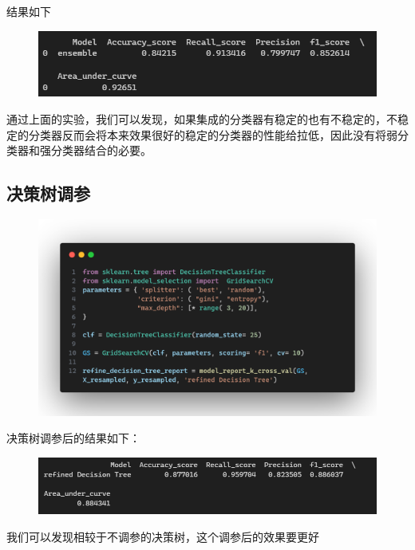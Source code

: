 \documentclass{article}
\begin{document}
结果如下
\begin{figure}[H]
	\centering
	\includegraphics[width=\textwidth]{./img/voting_res.png}
\end{figure}

通过上面的实验，我们可以发现，如果集成的分类器有稳定的也有不稳定的，不稳定的分类器反而会将本来效果很好的稳定的分类器的性能给拉低，因此没有将弱分类器和强分类器结合的必要。

\subsection{决策树调参}

\begin{figure}[H]
	\centering
	\includegraphics[width=\textwidth]{./img/refine_dt.png}
\end{figure}

决策树调参后的结果如下：

\begin{figure}[H]
	\centering
	\includegraphics[width=\textwidth]{./img/refine_res.png}
\end{figure}

我们可以发现相较于不调参的决策树，这个调参后的效果要更好
\end{document}
